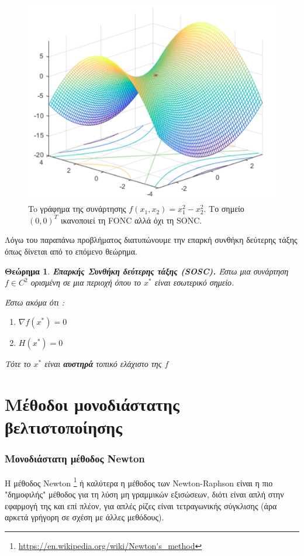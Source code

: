 \documentclass[a4paper,12pt,twoside]{report}
\theoremstyle{plain}
\newtheorem{thm}{Θεώρημα}[section] %
\theoremstyle{definition}
\theoremstyle{remark}
\begin{document}
\begin{figure}[H]	
	\includegraphics[scale= 0.5]{fonc-sonc}
	\centering
    \caption{To γράφημα της συνάρτησης $f(x_1,x_2) = x_1^2-x_2^2$. Το σημείο $(0,0)^T$ ικανοποιεί τη FONC αλλά όχι τη SONC.}
\end{figure}
Λόγω του παραπάνω προβλήματος διατυπώνουμε την επαρκή συνθήκη δεύτερης τάξης όπως δίνεται από το επόμενο θεώρημα.

\begin{thm}{\textbf{Επαρκής Συνθήκη δεύτερης τάξης (SOSC).}}
Έστω μια συνάρτηση $f\in C^2$ ορισμένη σε μια περιοχή όπου το $x^*$ είναι εσωτερικό σημείο. 

Έστω ακόμα ότι :

\begin{enumerate}
	\item $\nabla f(x^*) = 0 $
	\item $H(x^*) = 0$
\end{enumerate}

Τότε το $x^*$ είναι \textbf{αυστηρά} τοπικό ελάχιστο της $f$	
\end{thm}

\section{Μέθοδοι μονοδιάστατης βελτιστοποίησης}
\subsubsection{Μονοδιάστατη μέθοδος Newton}
Η μέθοδος Newton \footnote{\url{https://en.wikipedia.org/wiki/Newton's\_method}} ή καλύτερα η μέθοδος των Newton-Raphson είναι η πιο "δημοφιλής" μέθοδος για τη λύση μη γραμμικών εξισώσεων, διότι είναι απλή στην εφαρμογή της και επί πλέον, για απλές ρίζες είναι τετραγωνικής σύγκλισης (άρα αρκετά γρήγορη σε σχέση με άλλες μεθόδους).
\end{document}
